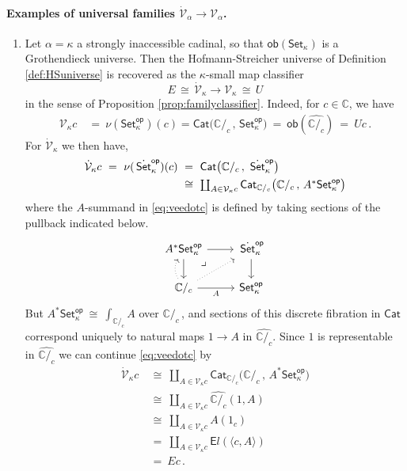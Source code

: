 \documentclass[12pt]{article}
\newcommand{\bbC}{\ensuremath{\mathbb{C}}}
\newcommand{\Set}{\ensuremath{\mathsf{Set}}}
\newcommand{\Cat}{\ensuremath{\mathsf{Cat}}}
\renewcommand{\to}{\ensuremath{\rightarrow}}
\newcommand{\too}{\ensuremath{\longrightarrow}}
\newcommand{\V}{\ensuremath{\mathcal{V}}}
\newcommand{\VV}{\ensuremath{\dot{\mathcal{V}}}}
\newcommand{\SSet}{\ensuremath{\,\dot{\Set}}}
\theoremstyle{remark}
\theoremstyle{definition}
\newcommand{\pbmark}{\ar[dr, phantom, "\lrcorner" very near start, shift right=.5ex]}	%
\begin{document}
\paragraph{Examples of universal families $\VV_\alpha \too \V_\alpha$.}

\begin{enumerate}
%
\item Let $\alpha = \kappa$ a strongly inaccessible cadinal, so that $\mathsf{ob}({\Set_\kappa})$ is a Grothendieck universe.  Then the Hofmann-Streicher universe of Definition \ref{def:HSuniverse} is recovered as the $\kappa$-small map classifier
\begin{equation*}
E\, \cong\, \VV_\kappa \too \V_\kappa\, \cong\, U
\end{equation*}
 in the sense of Proposition \ref{prop:familyclassifier}.  Indeed, for $c\in\bbC$, we have 
 \begin{align}
  \V_{\kappa}{c}\ &=\ \nu(\Set^{\mathsf{op}}_\kappa)(c) = \Cat\big( {\bbC/_c}\,,\, \Set^{\mathsf{op}}_\kappa \big)\  =\ \mathsf{ob}(\widehat{\bbC/_c})\ =\ U{c} \,.
   \end{align} 
For $\VV_{\kappa}$ we then have,
   \begin{align}\label{eq:veedotc}
   \VV_{\kappa}{c}\ =\ \nu(\SSet^{\mathsf{op}}_\kappa)(c)\ &=\ \Cat\big( {\bbC/_c}\,,\, \SSet^{\mathsf{op}}_\kappa \big) \notag \\ 
   &\cong\ {\textstyle \coprod_{A\in\V_{\kappa}{c}}\Cat_{{\bbC/_c}}\big( {\bbC/_c}\,,\, A^*\Set^{\mathsf{op}}_\kappa \big)}
   \end{align}
   where the $A$-summand in \eqref{eq:veedotc} is defined by taking sections of the  pullback indicated below.
   \begin{equation}\label{eq:pbforindexing}\textstyle
\begin{tikzcd}
	A^*\Set^{\mathsf{op}}_\kappa \ar[d] \ar[r] \pbmark & \SSet^{\mathsf{op}}_\kappa \ar[d]\\  
	\bbC/_c \ar[r,swap,"A"] \ar[u, bend left, dotted] \ar[ur, dotted] &  \Set^{\mathsf{op}}_\kappa
 \end{tikzcd}
 \end{equation}
 But $A^*\Set^{\mathsf{op}}_\kappa\ \cong\ {\textstyle \int_{\bbC/_c}\!A}$ over $\bbC/_c\,$, and sections of this discrete fibration in $\Cat$ correspond uniquely to natural maps $1\to A$ in $\widehat{{\bbC/_c}}$.  Since $1$  is representable in $\widehat{{\bbC/_c}}$ we can continue \eqref{eq:veedotc} by
  \begin{align*}
   \VV_{\kappa}{c}\ &\cong\ {\textstyle \coprod_{A\in \V_{\kappa}{c}}\Cat_{{\bbC/_c}}\big( {\bbC/_c}\,,\, A^*\Set^{\mathsf{op}}_\kappa \big)}\\
   	&\cong\ {\textstyle \coprod_{A\in \V_{\kappa}{c}} \widehat{{\bbC/_c}}(1, A)}\\
	&\cong\ {\textstyle \coprod_{A\in \V_{\kappa}{c}} A(1_c) } \\
	& =\ {\textstyle \coprod_{A\in \V_{\kappa}{c}} {\mathsf{E}l}(\langle c, A\rangle)}\\
	& =\  E c\,.
   \end{align*}
 

\end{enumerate}
\end{document}
